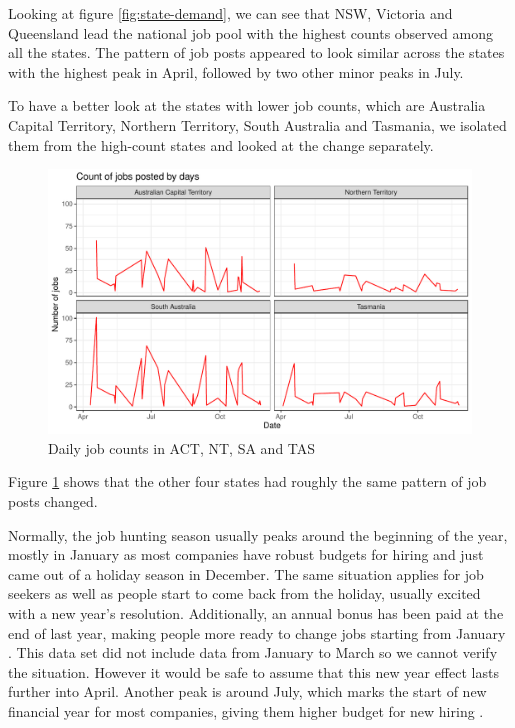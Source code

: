 \documentclass[11pt,a4paper,]{article}
\begin{document}
Looking at figure \ref{fig:state-demand}, we can see that NSW, Victoria and Queensland lead the national job pool with the highest counts observed among all the states. The pattern of job posts appeared to look similar across the states with the highest peak in April, followed by two other minor peaks in July.

To have a better look at the states with lower job counts, which are Australia Capital Territory, Northern Territory, South Australia and Tasmania, we isolated them from the high-count states and looked at the change separately.

\begin{figure}
\centering
\includegraphics{Team_JHDP_Assignment4_files/figure-latex/low-demand-state-1.pdf}
\caption{\label{fig:low-demand-state}Daily job counts in ACT, NT, SA and TAS}
\end{figure}

Figure \ref{fig:low-demand-state} shows that the other four states had roughly the same pattern of job posts changed.

Normally, the job hunting season usually peaks around the beginning of the year, mostly in January as most companies have robust budgets for hiring and just came out of a holiday season in December. The same situation applies for job seekers as well as people start to come back from the holiday, usually excited with a new year's resolution. Additionally, an annual bonus has been paid at the end of last year, making people more ready to change jobs starting from January \textcite{emswiler_2016}. This data set did not include data from January to March so we cannot verify the situation. However it would be safe to assume that this new year effect lasts further into April. Another peak is around July, which marks the start of new financial year for most companies, giving them higher budget for new hiring \textcite{emswiler_2016}.
\end{document}
